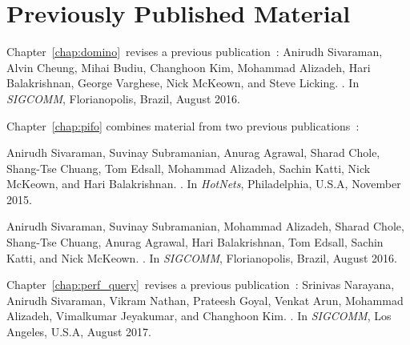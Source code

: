 \chapter*{Previously Published Material}
%

{
\setlength{\parindent}{0 pt}
\setlength{\parskip}{\baselineskip}

Chapter~\ref{chap:domino}~revises a previous
publication~\cite{domino_sigcomm}:
Anirudh Sivaraman, Alvin Cheung, Mihai Budiu, Changhoon Kim, Mohammad Alizadeh, Hari Balakrishnan, George Varghese, Nick McKeown, and Steve Licking.
.
\newblock In {\em SIGCOMM}, Florianopolis, Brazil, August 2016.

Chapter~\ref{chap:pifo} combines material from two previous
publications~\cite{pifo_hotnets, pifo_sigcomm}:
\begin{CompactEnumerate}
\item
Anirudh Sivaraman, Suvinay Subramanian, Anurag Agrawal, Sharad Chole, Shang-Tse Chuang, Tom Edsall, Mohammad Alizadeh, Sachin Katti, Nick McKeown, and Hari Balakrishnan.
.
\newblock In {\em HotNets}, Philadelphia, U.S.A, November 2015.

\item
Anirudh Sivaraman, Suvinay Subramanian, Mohammad Alizadeh, Sharad Chole, Shang-Tse Chuang, Anurag Agrawal, Hari Balakrishnan, Tom Edsall, Sachin Katti, and Nick McKeown.
.
\newblock In {\em SIGCOMM}, Florianopolis, Brazil, August 2016.
\end{CompactEnumerate}

Chapter~\ref{chap:perf_query}~revises a previous publication~\cite{perf_query}:
Srinivas Narayana, Anirudh Sivaraman, Vikram Nathan, Prateesh Goyal, Venkat Arun, Mohammad Alizadeh, Vimalkumar Jeyakumar, and Changhoon Kim.
.
\newblock In {\em SIGCOMM}, Los Angeles, U.S.A, August 2017.
}
